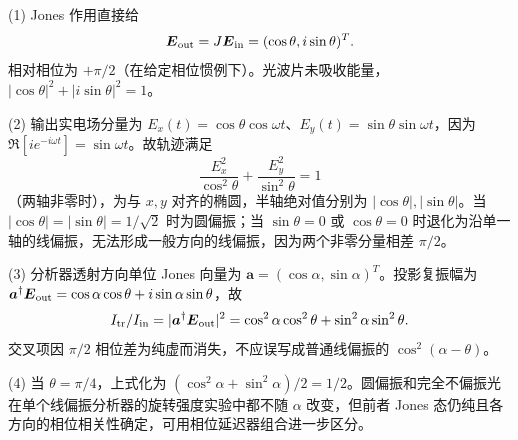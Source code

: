 (1) Jones 作用直接给
\[
\boldsymbol E_{\rm out}=J\boldsymbol E_{\rm in}
=(\cos\theta,i\sin\theta)^T.
\]
相对相位为 \(+\pi/2\)（在给定相位惯例下）。光波片未吸收能量，\(|\cos\theta|^2+|i\sin\theta|^2=1\)。

(2) 输出实电场分量为 \(E_x(t)=\cos\theta\cos\omega t\)、\(E_y(t)=\sin\theta\sin\omega t\)，因为 \(\Re[i e^{-i\omega t}]=\sin\omega t\)。故轨迹满足
\[
\frac{E_x^2}{\cos^2\theta}+\frac{E_y^2}{\sin^2\theta}=1
\]
（两轴非零时），为与 \(x,y\) 对齐的椭圆，半轴绝对值分别为 \(|\cos\theta|,|\sin\theta|\)。当 \(|\cos\theta|=|\sin\theta|=1/\sqrt2\) 时为圆偏振；当 \(\sin\theta=0\) 或 \(\cos\theta=0\) 时退化为沿单一轴的线偏振，无法形成一般方向的线偏振，因为两个非零分量相差 \(\pi/2\)。

(3) 分析器透射方向单位 Jones 向量为 \(\boldsymbol a=(\cos\alpha,\sin\alpha)^T\)。投影复振幅为 \(\boldsymbol a^\dagger\boldsymbol E_{\rm out}=\cos\alpha\cos\theta+i\sin\alpha\sin\theta\)，故
\[
I_{\rm tr}/I_{\rm in}
=|\boldsymbol a^\dagger\boldsymbol E_{\rm out}|^2
=\cos^2\alpha\cos^2\theta+\sin^2\alpha\sin^2\theta.
\]
交叉项因 \(\pi/2\) 相位差为纯虚而消失，不应误写成普通线偏振的 \(\cos^2(\alpha-\theta)\)。

(4) 当 \(\theta=\pi/4\)，上式化为 \((\cos^2\alpha+\sin^2\alpha)/2=1/2\)。圆偏振和完全不偏振光在单个线偏振分析器的旋转强度实验中都不随 \(\alpha\) 改变，但前者 Jones 态仍纯且各方向的相位相关性确定，可用相位延迟器组合进一步区分。
